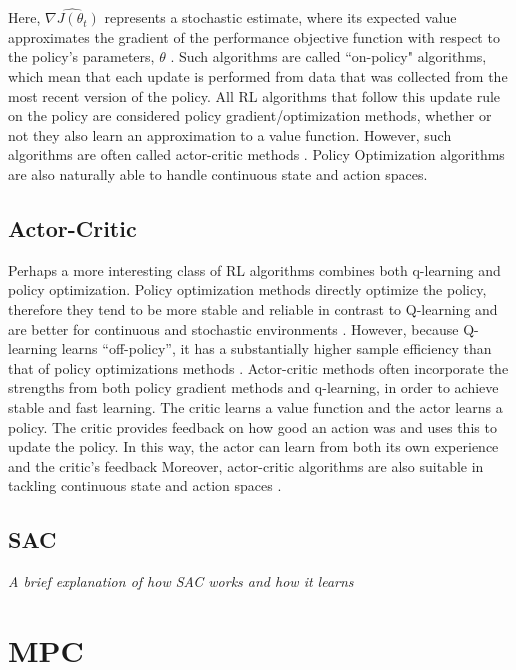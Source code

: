 Here, $\hat{\nabla J(\theta_t)}$ represents a stochastic estimate, where its expected value approximates the gradient of the performance objective function with respect to the policy's parameters, $\theta$ \cite{suttonReinforcementLearningIntroduction2014}. Such algorithms are called ``on-policy" algorithms, which mean that each update is performed from data that was collected from the most recent version of the policy.
All RL algorithms that follow this update rule on the policy are considered policy gradient/optimization methods, whether or not they also learn an approximation to a value function. However, such algorithms are often called actor-critic methods \cite{suttonReinforcementLearningIntroduction2014}.  Policy Optimization algorithms are also naturally able to handle continuous state and action spaces.


\subsection{Actor-Critic}
Perhaps a more interesting class of RL algorithms combines both q-learning and policy optimization. Policy optimization methods directly optimize the policy, therefore they tend to be more stable and reliable in contrast to Q-learning and are better for continuous and stochastic environments \cite{suttonReinforcementLearningIntroduction2014}. However, because Q-learning learns ``off-policy'', it has a substantially higher sample efficiency than that of policy optimizations methods \cite{suttonReinforcementLearningIntroduction2014}.
Actor-critic methods often incorporate the strengths from both policy gradient methods and q-learning, in order to achieve stable and fast learning. The critic learns a value function and the actor learns a policy. The critic provides feedback on how good an action was and uses this to update the policy. In this way, the actor can learn from both its own experience and the critic's feedback 
Moreover, actor-critic algorithms are also suitable in tackling continuous state and action spaces \cite{suttonReinforcementLearningIntroduction2014}.

\subsection{SAC}
\emph{A brief explanation of how SAC works and how it learns}


\section{MPC}
